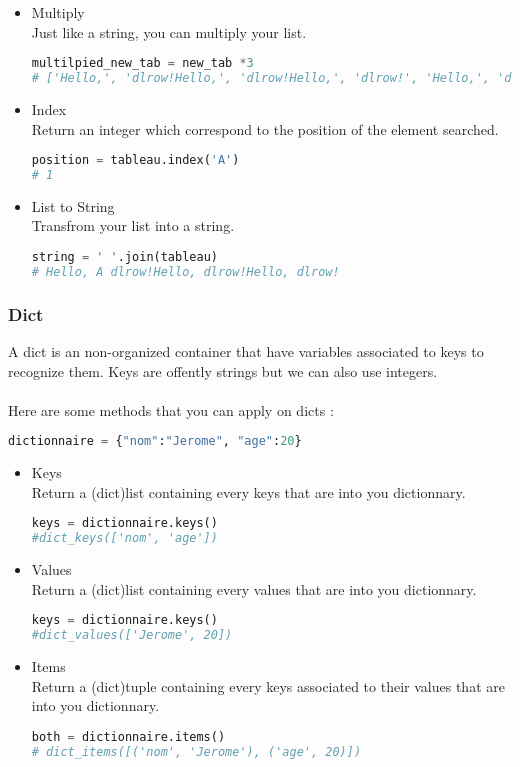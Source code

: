\documentclass[a4paper, 12pt]{article}
\begin{document}
\begin{itemize}
\item Multiply \\
Just like a string, you can multiply your list.
\begin{lstlisting}[language=Python]
multilpied_new_tab = new_tab *3
# ['Hello,', 'dlrow!Hello,', 'dlrow!Hello,', 'dlrow!', 'Hello,', 'dlrow!Hello,', 'dlrow!Hello,', 'dlrow!', 'Hello,', 'dlrow!Hello,', 'dlrow!Hello,', 'dlrow!']
\end{lstlisting}

\item Index \\
Return an integer which correspond to the position of the element searched.
\begin{lstlisting}[language=Python]
position = tableau.index('A')
# 1
\end{lstlisting}

\item List to String \\
Transfrom your list into a string.
\begin{lstlisting}[language=Python]
string = ' '.join(tableau)
# Hello, A dlrow!Hello, dlrow!Hello, dlrow!
\end{lstlisting}
\end{itemize}

\subsubsection{Dict}
A dict is an non-organized container that have variables associated to keys to recognize them. Keys are offently strings but we can also use integers.\\ \\
Here are some methods that you can apply on dicts : 
\begin{lstlisting}[language=Python]
dictionnaire = {"nom":"Jerome", "age":20}
\end{lstlisting}

\begin{itemize}
\item Keys \\
Return a (dict)list containing every keys that are into you dictionnary.
\begin{lstlisting}[language=Python]
keys = dictionnaire.keys()
#dict_keys(['nom', 'age'])
\end{lstlisting}

\item Values \\
Return a (dict)list containing every values that are into you dictionnary.
\begin{lstlisting}[language=Python]
keys = dictionnaire.keys()
#dict_values(['Jerome', 20])
\end{lstlisting}

\item Items \\
Return a (dict)tuple containing every keys associated to their values that are into you dictionnary.
\begin{lstlisting}[language=Python]
both = dictionnaire.items()
# dict_items([('nom', 'Jerome'), ('age', 20)])
\end{lstlisting}
\end{itemize}
\end{document}
